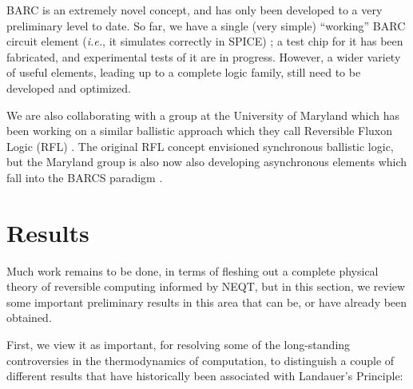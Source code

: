 \documentclass[preprints,article,accept,moreauthors,pdftex]{Definitions/mdpi}
\begin{document}
\begin{paracol}{2}
BARC is an extremely novel concept, and has only been developed to a very preliminary level to date.  So far, we have a single (very simple) ``working'' BARC circuit element (\emph{i.e.}, it simulates correctly in SPICE) \cite{Fra+19b}; a test chip for it has been fabricated, and experimental tests of it are in progress. However, a wider variety of useful elements, leading up to a complete logic family, still need to be developed and optimized.

We are also collaborating with a group at the University of Maryland which has been working on a similar ballistic approach which they call Reversible Fluxon Logic (RFL) \cite{WO17,OW18,WO18,YWO19,OW19,OW20,WO20}.  The original RFL concept envisioned synchronous ballistic logic, but the Maryland group is also now also developing asynchronous elements which fall into the BARCS paradigm \cite{WO20b}.



\section{Results}
\label{sec:res}

Much work remains to be done, in terms of fleshing out a complete physical theory of reversible computing informed by NEQT, but in this section, we review some important preliminary results in this area that can be, or have already been obtained.

First, we view it as important, for resolving some of the long-standing controversies in the thermodynamics of computation, to distinguish a couple of different results that have historically been associated with Landauer's Principle:

\begin{enumerate}


\end{enumerate}
\end{paracol}
\end{document}
